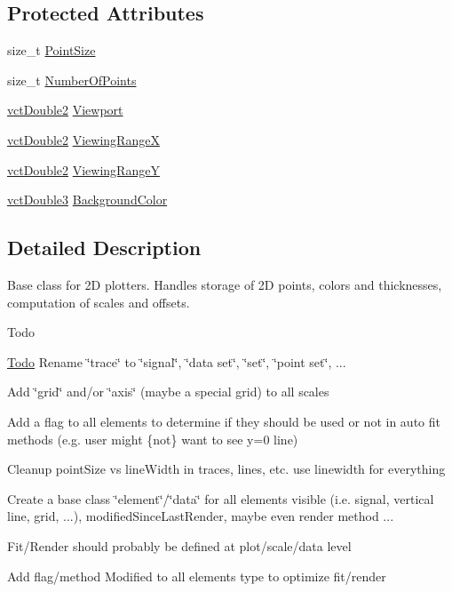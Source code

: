 \subsection*{Protected Attributes}
\begin{DoxyCompactItemize}
\item 
size\-\_\-t \hyperlink{classvct_plot2_d_base_a4f238d9c5cefdb5c623b4967ba0e678b}{Point\-Size}
\item 
size\-\_\-t \hyperlink{classvct_plot2_d_base_af1645f053dd8310557ec4595d43516a8}{Number\-Of\-Points}
\item 
\hyperlink{vct_fixed_size_vector_types_8h_afc0fdcc41cbe8b043747612501610812}{vct\-Double2} \hyperlink{classvct_plot2_d_base_a35e351a70eb6b942f80d354a74a9eb8b}{Viewport}
\item 
\hyperlink{vct_fixed_size_vector_types_8h_afc0fdcc41cbe8b043747612501610812}{vct\-Double2} \hyperlink{classvct_plot2_d_base_aac54c32c843faaba49bfa0424ac4009f}{Viewing\-Range\-X}
\item 
\hyperlink{vct_fixed_size_vector_types_8h_afc0fdcc41cbe8b043747612501610812}{vct\-Double2} \hyperlink{classvct_plot2_d_base_a61aef57ba3009eef0104325f64c8524f}{Viewing\-Range\-Y}
\item 
\hyperlink{vct_fixed_size_vector_types_8h_a4a89122c9d7f72c3f31fe8126e17c3af}{vct\-Double3} \hyperlink{classvct_plot2_d_base_a74038c085cabcddebdb1195dc0062ddf}{Background\-Color}
\end{DoxyCompactItemize}


\subsection{Detailed Description}
Base class for 2\-D plotters. Handles storage of 2\-D points, colors and thicknesses, computation of scales and offsets.

\begin{DoxyRefDesc}{Todo}
\item[\hyperlink{todo__todo000005}{Todo}]Rename \char`\"{}trace\char`\"{} to \char`\"{}signal\char`\"{}, \char`\"{}data set\char`\"{}, \char`\"{}set\char`\"{}, \char`\"{}point set\char`\"{}, ... 

Add \char`\"{}grid\char`\"{} and/or \char`\"{}axis\char`\"{} (maybe a special grid) to all scales 

Add a flag to all elements to determine if they should be used or not in auto fit methods (e.\-g. user might \{not\} want to see y=0 line) 

Cleanup point\-Size vs line\-Width in traces, lines, etc. use linewidth for everything 

Create a base class \char`\"{}element\char`\"{}/\char`\"{}data\char`\"{} for all elements visible (i.\-e. signal, vertical line, grid, ...), modified\-Since\-Last\-Render, maybe even render method ... 

Fit/\-Render should probably be defined at plot/scale/data level 

Add flag/method Modified to all elements type to optimize fit/render \end{DoxyRefDesc}


